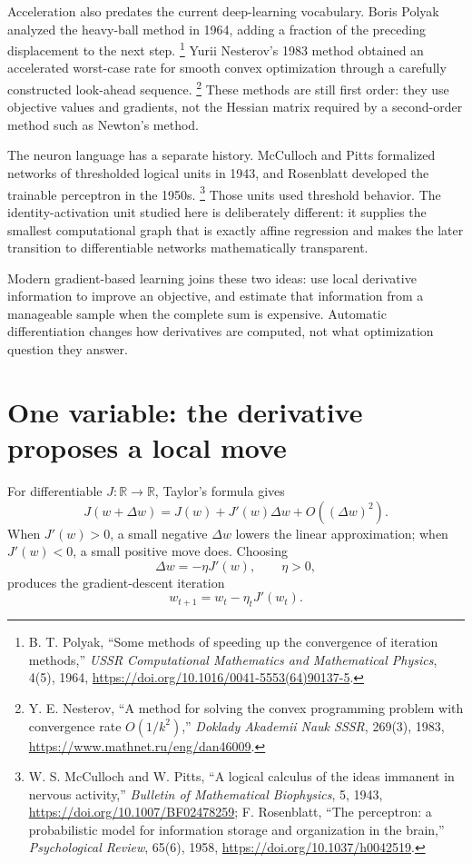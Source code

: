 Acceleration also predates the current deep-learning vocabulary. Boris Polyak
analyzed the heavy-ball method in 1964, adding a fraction of the preceding
displacement to the next step.
\footnote{B. T. Polyak, ``Some methods of speeding up the convergence of
iteration methods,'' \emph{USSR Computational Mathematics and Mathematical
Physics}, 4(5), 1964,
\url{https://doi.org/10.1016/0041-5553(64)90137-5}.}
Yurii Nesterov's 1983 method obtained an accelerated worst-case rate for smooth
convex optimization through a carefully constructed look-ahead sequence.
\footnote{Y. E. Nesterov, ``A method for solving the convex programming
problem with convergence rate $O(1/k^2)$,'' \emph{Doklady Akademii Nauk SSSR},
269(3), 1983, \url{https://www.mathnet.ru/eng/dan46009}.}
These methods are still first order: they use objective values and gradients,
not the Hessian matrix required by a second-order method such as Newton's
method.

The neuron language has a separate history. McCulloch and Pitts formalized
networks of thresholded logical units in 1943, and Rosenblatt developed the
trainable perceptron in the 1950s.
\footnote{W. S. McCulloch and W. Pitts, ``A logical calculus of the ideas
immanent in nervous activity,'' \emph{Bulletin of Mathematical Biophysics}, 5,
1943, \url{https://doi.org/10.1007/BF02478259}; F. Rosenblatt, ``The perceptron:
a probabilistic model for information storage and organization in the brain,''
\emph{Psychological Review}, 65(6), 1958,
\url{https://doi.org/10.1037/h0042519}.}
Those units used threshold behavior. The identity-activation unit studied here
is deliberately different: it supplies the smallest computational graph that
is exactly affine regression and makes the later transition to differentiable
networks mathematically transparent.

Modern gradient-based learning joins these two ideas: use local derivative
information to improve an objective, and estimate that information from a
manageable sample when the complete sum is expensive. Automatic
differentiation changes how derivatives are computed, not what optimization
question they answer.

\section{One variable: the derivative proposes a local move}

For differentiable $J:\mathbb{R}\rightarrow\mathbb{R}$, Taylor's formula gives
\[
J(w+\Delta w)=J(w)+J'(w)\Delta w+O((\Delta w)^2).
\]
When $J'(w)>0$, a small negative $\Delta w$ lowers the linear approximation;
when $J'(w)<0$, a small positive move does. Choosing
\[
\Delta w=-\eta J'(w),\qquad \eta>0,
\]
produces the gradient-descent iteration
\[
w_{t+1}=w_t-\eta_tJ'(w_t).
\]

